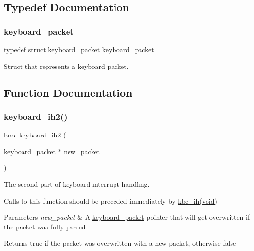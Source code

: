 \subsection{Typedef Documentation}
\mbox{\label{group__keyboard_ga823c244c9bc4e1f5004a548133e112d9}} 
\subsubsection{\texorpdfstring{keyboard\+\_\+packet}{keyboard\_packet}}
{\footnotesize\ttfamily typedef struct \hyperlink{structkeyboard__packet}{keyboard\+\_\+packet}  \hyperlink{structkeyboard__packet}{keyboard\+\_\+packet}}



Struct that represents a keyboard packet. 



\subsection{Function Documentation}
\mbox{\label{group__keyboard_ga92937e5072f297d330bd57bb62cd35fb}} 
\subsubsection{\texorpdfstring{keyboard\+\_\+ih2()}{keyboard\_ih2()}}
{\footnotesize\ttfamily bool keyboard\+\_\+ih2 (\begin{DoxyParamCaption}\item[{\hyperlink{structkeyboard__packet}{keyboard\+\_\+packet} $\ast$}]{new\+\_\+packet }\end{DoxyParamCaption})}



The second part of keyboard interrupt handling. 

Calls to this function should be preceded immediately by \hyperlink{keyboard_8c_a5761bd4aad91ac1d68916ad88f583d9f}{kbc\+\_\+ih(void)}


\begin{DoxyParams}{Parameters}
{\em new\+\_\+packet} & A \hyperlink{structkeyboard__packet}{keyboard\+\_\+packet} pointer that will get overwritten if the packet was fully parsed \\
\hline
\end{DoxyParams}
\begin{DoxyReturn}{Returns}
true if the packet was overwritten with a new packet, otherwise false 
\end{DoxyReturn}
\mbox{\label{group__keyboard_ga803d759506fefe9119ad529c783b3a7a}} 

